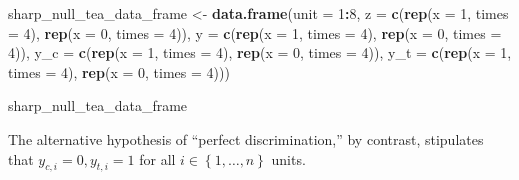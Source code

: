 \documentclass[12pt,leqno]{article}
\newenvironment{Shaded}{\begin{snugshade}}{\end{snugshade}}
\newcommand{\DataTypeTok}[1]{\textcolor[rgb]{0.13,0.29,0.53}{#1}}
\newcommand{\DecValTok}[1]{\textcolor[rgb]{0.00,0.00,0.81}{#1}}
\newcommand{\KeywordTok}[1]{\textcolor[rgb]{0.13,0.29,0.53}{\textbf{#1}}}
\newcommand{\NormalTok}[1]{#1}
\newcommand{\OperatorTok}[1]{\textcolor[rgb]{0.81,0.36,0.00}{\textbf{#1}}}
\newcommand{\StringTok}[1]{\textcolor[rgb]{0.31,0.60,0.02}{#1}}
\theoremstyle{newstyle}
\begin{document}
\begin{Shaded}
\begin{Highlighting}[]
\NormalTok{sharp_null_tea_data_frame <-}\StringTok{ }\KeywordTok{data.frame}\NormalTok{(}\DataTypeTok{unit =} \DecValTok{1}\OperatorTok{:}\DecValTok{8}\NormalTok{,}
                                        \DataTypeTok{z =} \KeywordTok{c}\NormalTok{(}\KeywordTok{rep}\NormalTok{(}\DataTypeTok{x =} \DecValTok{1}\NormalTok{, }\DataTypeTok{times =} \DecValTok{4}\NormalTok{),}
                                              \KeywordTok{rep}\NormalTok{(}\DataTypeTok{x =} \DecValTok{0}\NormalTok{, }\DataTypeTok{times =} \DecValTok{4}\NormalTok{)),}
                                        \DataTypeTok{y =} \KeywordTok{c}\NormalTok{(}\KeywordTok{rep}\NormalTok{(}\DataTypeTok{x =} \DecValTok{1}\NormalTok{, }\DataTypeTok{times =} \DecValTok{4}\NormalTok{),}
                                              \KeywordTok{rep}\NormalTok{(}\DataTypeTok{x =} \DecValTok{0}\NormalTok{, }\DataTypeTok{times =} \DecValTok{4}\NormalTok{)),}
                                        \DataTypeTok{y_c =} \KeywordTok{c}\NormalTok{(}\KeywordTok{rep}\NormalTok{(}\DataTypeTok{x =} \DecValTok{1}\NormalTok{, }\DataTypeTok{times =} \DecValTok{4}\NormalTok{),}
                                                \KeywordTok{rep}\NormalTok{(}\DataTypeTok{x =} \DecValTok{0}\NormalTok{, }\DataTypeTok{times =} \DecValTok{4}\NormalTok{)),}
                                        \DataTypeTok{y_t =} \KeywordTok{c}\NormalTok{(}\KeywordTok{rep}\NormalTok{(}\DataTypeTok{x =} \DecValTok{1}\NormalTok{, }\DataTypeTok{times =} \DecValTok{4}\NormalTok{),}
                                                \KeywordTok{rep}\NormalTok{(}\DataTypeTok{x =} \DecValTok{0}\NormalTok{, }\DataTypeTok{times =} \DecValTok{4}\NormalTok{)))}

\NormalTok{sharp_null_tea_data_frame}
\end{Highlighting}
\end{Shaded}

The alternative hypothesis of ``perfect discrimination,'' by contrast,
stipulates that \(y_{c,i} = 0, y_{t,i} = 1\) for all
\(i \in \left\{1, \dots, n \right\}\) units.
\end{document}
